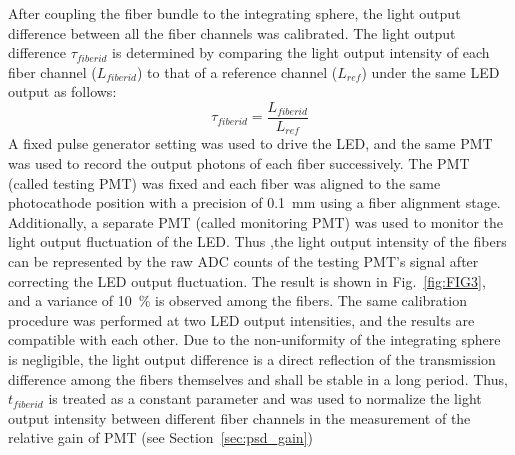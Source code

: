 \documentclass{nst}
\begin{document}
After coupling the fiber bundle to the integrating sphere, the light output difference between all the fiber channels was calibrated. 
The light output difference $\tau_{fiberid}$ is determined by comparing the light output intensity of each fiber channel ($L_{fiberid}$) to that of a reference channel ($L_{ref}$) under the same LED output as follows:
\begin{equation}
	\tau_{fiberid} = \frac{L_{fiberid}}{L_{ref}}
\end{equation} 
A fixed pulse generator setting was used to drive the LED, and the same PMT was used to record the output photons of each fiber successively.
The PMT (called testing PMT) was fixed and each fiber was aligned to the same photocathode position with a precision of \SI{0.1}{\milli\meter} using a fiber alignment stage.
Additionally, a separate PMT (called monitoring PMT) was used to monitor the light output fluctuation of the LED.
Thus ,the light output intensity of the fibers can be represented by the raw ADC counts of the testing PMT's signal after correcting the LED output fluctuation.
The result is shown in Fig.~\ref{fig:FIG3}, and a variance of \SI{10}{\percent} is observed among the fibers.
The same calibration procedure was performed at two LED output intensities, and the results are compatible with each other. 
Due to the non-uniformity of the integrating sphere is negligible, the light output difference is a direct reflection of the transmission difference among the fibers themselves and shall be stable in a long period.
Thus, $t_{fiberid}$ is treated as a constant parameter and was used to normalize the light output intensity between different fiber channels in the measurement of the relative gain of PMT (see Section~\ref{sec:psd_gain})
\end{document}
